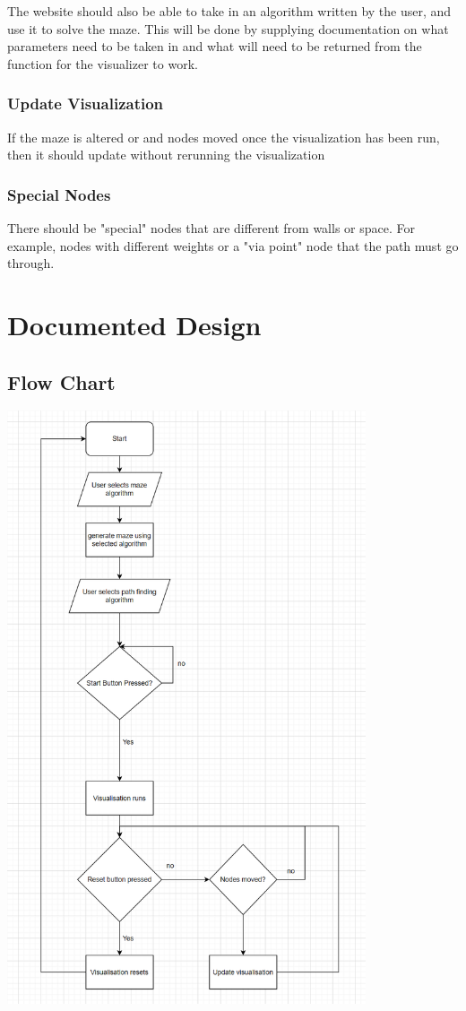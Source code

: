 \documentclass{article}
\begin{document}
The website should also be able to take in an algorithm written by the user, and use it to solve the maze. This will be done by supplying documentation on what parameters need to be taken in and what will need to be returned from the function for the visualizer to work.
\subsubsection{Update Visualization}
If the maze is altered or and nodes moved once the visualization has been run, then it should update without rerunning the visualization

\subsubsection{Special Nodes}
There should be "special" nodes that are different from walls or space. For example, nodes with different weights or a "via point" node that the path must go through.
\section{Documented Design}
\subsection{Flow Chart}
\includegraphics[width=\linewidth, height=17.5cm]{assets/flow chart.PNG}
\end{document}
